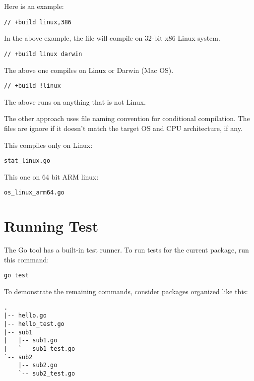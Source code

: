 Here is an example:

\begin{lstlisting}[numbers=none]
// +build linux,386
\end{lstlisting}

In the above example, the file will compile on 32-bit x86 Linux
system.

\begin{lstlisting}[numbers=none]
// +build linux darwin
\end{lstlisting}

The above one compiles on Linux or Darwin (Mac OS).

\begin{lstlisting}[numbers=none]
// +build !linux
\end{lstlisting}

The above runs on anything that is not Linux.

The other approach uses file naming convention for conditional
compilation.  The files are ignore if it doesn't match the target OS
and CPU architecture, if any.

This compiles only on Linux:

\begin{lstlisting}[numbers=none]
stat_linux.go
\end{lstlisting}

This one on 64 bit ARM linux:

\begin{lstlisting}[numbers=none]
os_linux_arm64.go
\end{lstlisting}

\section{Running Test}

The Go tool has a built-in test runner.  To run tests
for the current package, run this command:

\begin{lstlisting}[numbers=none]
go test
\end{lstlisting}

To demonstrate the remaining commands, consider packages organized
like this:

\begin{lstlisting}[numbers=none]
.
|-- hello.go
|-- hello_test.go
|-- sub1
|   |-- sub1.go
|   `-- sub1_test.go
`-- sub2
    |-- sub2.go
    `-- sub2_test.go
\end{lstlisting}


